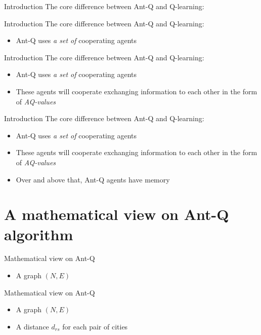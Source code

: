 \documentclass[aspectratio=169,xcolor=dvipsnames]{beamer}
\begin{document}
\begin{frame}{Introduction}
    The core difference between Ant-Q and Q-learning:
\end{frame}

\begin{frame}{Introduction}
    The core difference between Ant-Q and Q-learning:
    \begin{itemize}
        \item Ant-Q uses \textit{\alert{a set of}} cooperating agents
    \end{itemize}
\end{frame}

\begin{frame}{Introduction}
    The core difference between Ant-Q and Q-learning:
    \begin{itemize}
        \item Ant-Q uses \textit{\alert{a set of}} cooperating agents
        \item These agents will cooperate exchanging information to each other in the form of \textit{\alert{AQ-values}}
    \end{itemize}
\end{frame}

\begin{frame}{Introduction}
    The core difference between Ant-Q and Q-learning:
    \begin{itemize}
        \item Ant-Q uses \textit{\alert{a set of}} cooperating agents
        \item These agents will cooperate exchanging information to each other in the form of \textit{\alert{AQ-values}}
        \item Over and above that, Ant-Q agents have \alert{memory}
    \end{itemize}
\end{frame}

\section{A mathematical view on Ant-Q algorithm}
\begin{frame}{Mathematical view on Ant-Q}
    \begin{itemize}
        \item A graph $(N, E)$
    \end{itemize}
\end{frame}

\begin{frame}{Mathematical view on Ant-Q}
    \begin{itemize}
        \item A graph $(N, E)$
        \item A distance $d_{rs}$ for each pair of cities
    \end{itemize}
\end{frame}
\end{document}
